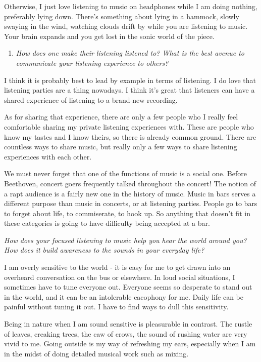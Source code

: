\documentclass[
]{book}
\providecommand{\tightlist}{%
  \setlength{\itemsep}{0pt}\setlength{\parskip}{0pt}}
\begin{document}
Otherwise, I just love listening to music on headphones while I am doing nothing, preferably lying down. There's something about lying in a hammock, slowly swaying in the wind, watching clouds drift by while you are listening to music. Your brain expands and you get lost in the sonic world of the piece.

\begin{enumerate}
\def\labelenumi{\arabic{enumi}.}
\setcounter{enumi}{3}
\tightlist
\item
  \emph{How does one make their listening listened to? What is the best avenue to communicate your listening experience to others?}
\end{enumerate}

I think it is probably best to lead by example in terms of listening. I do love that listening parties are a thing nowadays. I think it's great that listeners can have a shared experience of listening to a brand-new recording.

As for sharing that experience, there are only a few people who I really feel comfortable sharing my private listening experiences with. These are people who know my tastes and I know theirs, so there is already common ground. There are countless ways to share music, but really only a few ways to share listening experiences with each other.

We must never forget that one of the functions of music is a social one. Before Beethoven, concert goers frequently talked throughout the concert! The notion of a rapt audience is a fairly new one in the history of music. Music in bars serves a different purpose than music in concerts, or at listening parties. People go to bars to forget about life, to commiserate, to hook up. So anything that doesn't fit in these categories is going to have difficulty being accepted at a bar.

\emph{How does your focused listening to music help you hear the world around you? How does it build awareness to the sounds in your everyday life?}

I am overly sensitive to the world - it is easy for me to get drawn into an overheard conversation on the bus or elsewhere. In loud social situations, I sometimes have to tune everyone out. Everyone seems so desperate to stand out in the world, and it can be an intolerable cacophony for me. Daily life can be painful without tuning it out. I have to find ways to dull this sensitivity.

Being in nature when I am sound sensitive is pleasurable in contrast. The rustle of leaves, creaking trees, the caw of crows, the sound of rushing water are very vivid to me. Going outside is my way of refreshing my ears, especially when I am in the midst of doing detailed musical work such as mixing.
\end{document}
